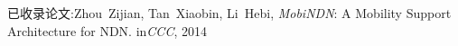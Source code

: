 \documentclass[12pt,a4paper,sans]{moderncv}   %
\begin{document}
\nocite{*}

{已收录论文:}{Zhou~Zijian, Tan~Xiaobin, Li~Hebi, \textit{MobiNDN}: A Mobility Support Architecture for NDN. in\emph{CCC}, 2014}

\end{document}
